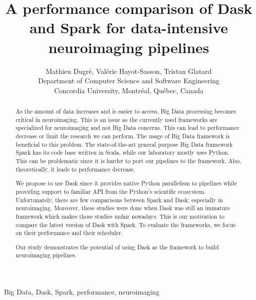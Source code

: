 \documentclass[conference]{IEEEtran}
\begin{document}
\title{A performance comparison of Dask and Spark for data-intensive neuroimaging pipelines}

\author{Mathieu Dugr\'e, Val\'erie Hayot-Sasson, Tristan Glatard\\
Department of Computer Science and Software Engineering\\
Concordia University, Montr\'eal, Qu\'ebec, Canada
}

\maketitle

\begin{abstract}
As the amount of data increases and is easier to access, Big Data processing becomes
critical in neuroimaging.
This is an issue as the currently used frameworks are specialized for neuroimaging
and not Big Data concerns. This can lead to performance decrease or limit the
research we can perform.
The usage of Big Data framework is beneficial to this problem. The state-of-the-art
general purpose Big Data framework Spark has its code base written in Scala, while
our laboratory mostly uses Python. This can be problematic since it is harder to port
our pipelines to the framework. Also, theoretically, it leads to performance decrease.

We propose to use Dask since it provides native Python parallelism to pipelines while
providing support to familiar API from the Python's scientific ecosystem.
Unfortunately, there are few comparisons between Spark and Dask; especially in
neuroimaging. Moreover, these studies were done when Dask was still an immature
framework which makes those studies unfair nowadays. This is our motivation to
compare the latest version of Dask with Spark.
To evaluate the frameworks, we focus on their performance and their scheduler.

Our study demonstrates the potential of using Dask as the framework to build
neuroimaging pipelines.
\end{abstract}

\begin{IEEEkeywords}
Big Data, Dask, Spark, performance, neuroimaging
\end{IEEEkeywords}
\end{document}
